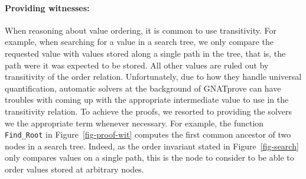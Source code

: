 \documentclass{llncs}
\newcommand{\gnatprove}{GNATprove\xspace}
\begin{document}
\paragraph{Providing witnesses:}
When reasoning about value ordering, it is common to use transitivity. For example, when searching for
a value in a search tree, we only compare the requested value with values stored along a single path in
the tree, that is, the path were it was expected to be stored. All other values are ruled out by
transitivity of the order relation. Unfortunately, due to how they handle universal quantification,
automatic solvers at the background of \gnatprove can have troubles with coming up with the appropriate
intermediate value to use in the transitivity relation. To achieve the proofs, we resorted to providing
the solvers we the appropriate term whenever necessary. For example, the function \texttt{Find\_Root} in
Figure~\ref{fig-proof-wit} computes the first common ancestor of two nodes in a search tree. Indeed, as
the order invariant stated in Figure~\ref{fig-search} only compares values on a single path, this
is the node to consider to be able to order values stored at arbitrary nodes.
\end{document}
